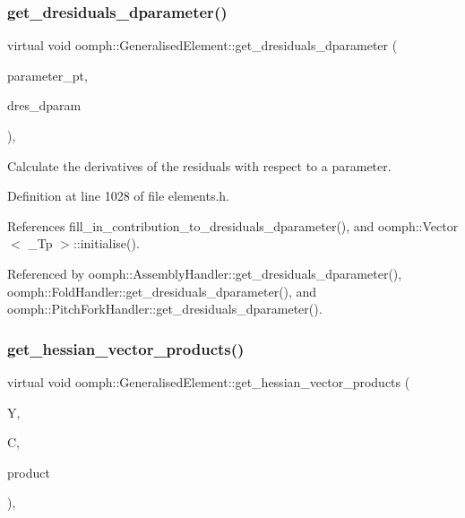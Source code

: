 \subsubsection{\texorpdfstring{get\+\_\+dresiduals\+\_\+dparameter()}{get\_dresiduals\_dparameter()}}
{\footnotesize\ttfamily virtual void oomph\+::\+Generalised\+Element\+::get\+\_\+dresiduals\+\_\+dparameter (\begin{DoxyParamCaption}\item[{double $\ast$const \&}]{parameter\+\_\+pt,  }\item[{\hyperlink{classoomph_1_1Vector}{Vector}$<$ double $>$ \&}]{dres\+\_\+dparam }\end{DoxyParamCaption})\hspace{0.3cm}{\ttfamily [inline]}, {\ttfamily [virtual]}}



Calculate the derivatives of the residuals with respect to a parameter. 



Definition at line 1028 of file elements.\+h.



References fill\+\_\+in\+\_\+contribution\+\_\+to\+\_\+dresiduals\+\_\+dparameter(), and oomph\+::\+Vector$<$ \+\_\+\+Tp $>$\+::initialise().



Referenced by oomph\+::\+Assembly\+Handler\+::get\+\_\+dresiduals\+\_\+dparameter(), oomph\+::\+Fold\+Handler\+::get\+\_\+dresiduals\+\_\+dparameter(), and oomph\+::\+Pitch\+Fork\+Handler\+::get\+\_\+dresiduals\+\_\+dparameter().

\mbox{\label{classoomph_1_1GeneralisedElement_a1fbe77c663eefdf38a0c95f62f6e51bb}} 
\subsubsection{\texorpdfstring{get\+\_\+hessian\+\_\+vector\+\_\+products()}{get\_hessian\_vector\_products()}}
{\footnotesize\ttfamily virtual void oomph\+::\+Generalised\+Element\+::get\+\_\+hessian\+\_\+vector\+\_\+products (\begin{DoxyParamCaption}\item[{\hyperlink{classoomph_1_1Vector}{Vector}$<$ double $>$ const \&}]{Y,  }\item[{\hyperlink{classoomph_1_1DenseMatrix}{Dense\+Matrix}$<$ double $>$ const \&}]{C,  }\item[{\hyperlink{classoomph_1_1DenseMatrix}{Dense\+Matrix}$<$ double $>$ \&}]{product }\end{DoxyParamCaption})\hspace{0.3cm}{\ttfamily [inline]}, {\ttfamily [virtual]}}



